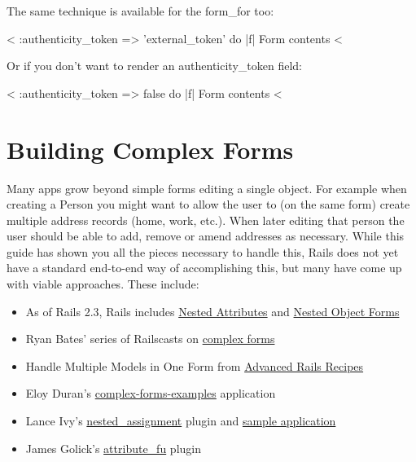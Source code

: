 \documentclass[10pt]{book}
\newenvironment{code}{%
  \scriptsize
    \verbatim
}{%
    \endverbatim
    \newline
}
\begin{document}
The same technique is available for the form\_for too:
\begin{code}
<%
    :authenticity_token => 'external_token' do |f|
  Form contents
<%
\end{code}

Or if you don’t want to render an authenticity\_token field:
\begin{code}
<%
    :authenticity_token => false do |f|
  Form contents
<%
\end{code}

\section{ Building Complex Forms}

Many apps grow beyond simple forms editing a single object. For  example when creating a Person you might want to allow the user to (on  the same form) create multiple address records (home, work, etc.). When  later editing that person the user should be able to add, remove or  amend addresses as necessary. While this guide has shown you all the  pieces necessary to handle this, Rails does not yet have a standard  end-to-end way of accomplishing this, but many have come up with viable  approaches. These include:
\begin{itemize}
	\item As of Rails 2.3, Rails includes \href{http://guides.rubyonrails.org/2_3_release_notes.html#nested-attributes}{Nested Attributes} and \href{http://guides.rubyonrails.org/2_3_release_notes.html#nested-object-forms}{Nested Object Forms}
	\item Ryan Bates’ series of Railscasts on \href{http://railscasts.com/episodes/75}{complex forms}
	\item Handle Multiple Models in One Form from \href{http://media.pragprog.com/titles/fr_arr/multiple_models_one_form.pdf}{Advanced Rails Recipes}
	\item Eloy Duran’s \href{https://github.com/alloy/complex-form-examples/}{complex-forms-examples} application
	\item Lance Ivy’s \href{https://github.com/cainlevy/nested_assignment/tree/master}{nested\_assignment} plugin and \href{https://github.com/cainlevy/complex-form-examples/tree/cainlevy}{sample application}
	\item James Golick’s \href{https://github.com/jamesgolick/attribute_fu}{attribute\_fu} plugin
\end{itemize}
\end{document}
